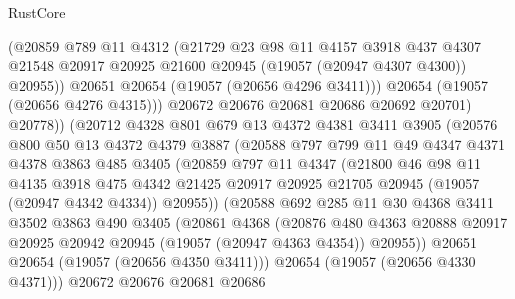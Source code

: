 \begin{lexlean}{RustCore}
\begin{coremodule}
                  (@20859
                    @789
                    @11
                    @4312
                    (@21729
                      @23
                      @98
                      @11
                      @4157
                      @3918
                      @437
                      @4307
                      @21548
                      @20917
                      @20925
                      @21600
                      @20945
                      (@19057 (@20947 @4307 @4300))
                      @20955))
                  @20651
                  @20654
                  (@19057 (@20656 @4296 @3411)))
                @20654
                (@19057 (@20656 @4276 @4315)))
              @20672
              @20676
              @20681
              @20686
              @20692
              @20701)
            @20778))
        (@20712
          @4328
          @801
          @679
          @13
          @4372
          @4381
          @3411
          @3905
          (@20576
            @800
            @50
            @13
            @4372
            @4379
            @3887
            (@20588
              @797
              @799
              @11
              @49
              @4347
              @4371
              @4378
              @3863
              @485
              @3405
              (@20859
                @797
                @11
                @4347
                (@21800
                  @46
                  @98
                  @11
                  @4135
                  @3918
                  @475
                  @4342
                  @21425
                  @20917
                  @20925
                  @21705
                  @20945
                  (@19057 (@20947 @4342 @4334))
                  @20955))
              (@20588
                @692
                @285
                @11
                @30
                @4368
                @3411
                @3502
                @3863
                @490
                @3405
                (@20861
                  @4368
                  (@20876
                    @480
                    @4363
                    @20888
                    @20917
                    @20925
                    @20942
                    @20945
                    (@19057 (@20947 @4363 @4354))
                    @20955))
                @20651
                @20654
                (@19057 (@20656 @4350 @3411)))
              @20654
              (@19057 (@20656 @4330 @4371)))
            @20672
            @20676
            @20681
            @20686

\end{coremodule}
\end{lexlean}

